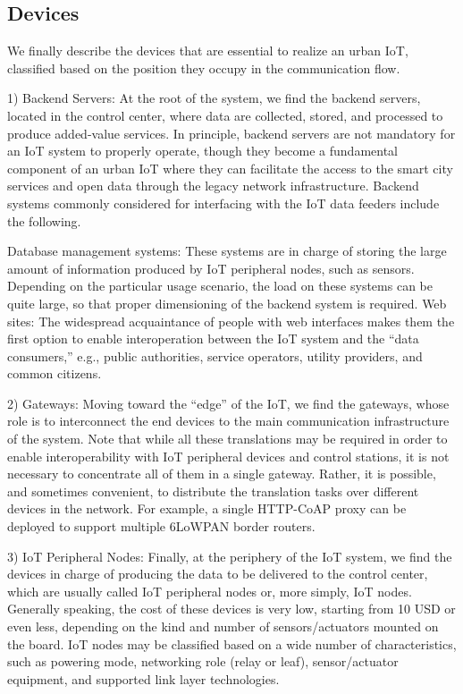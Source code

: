 \documentclass[conference,column]{IEEEtran}
\begin{document}
\subsection{Devices}We finally describe the devices that are essential to realize an urban IoT, classified based on the position they occupy in the communication flow.

1) Backend Servers: At the root of the system, we find the backend servers, located in the control center, where data are collected, stored, and processed to produce added-value services. In principle, backend servers are not mandatory for an IoT system to properly operate, though they become a fundamental component of an urban IoT where they can facilitate the access to
the smart city services and open data through the legacy network infrastructure. Backend systems commonly considered for interfacing with the IoT data feeders include the following.

Database management systems: These systems are in
charge of storing the large amount of information produced by IoT peripheral nodes, such as sensors. Depending on the particular usage scenario, the load on these systems can be quite large, so that proper dimensioning of the backend system is required.
Web sites: The widespread acquaintance of people with web interfaces makes them the first option to enable interoperation between the IoT system and the “data consumers,” e.g., public authorities, service operators, utility providers, and common
citizens.

2) Gateways: Moving toward the “edge” of the IoT, we find the gateways, whose role is to interconnect the end devices to the main communication infrastructure of the system. Note that while all these translations may be required in order to enable interoperability with IoT peripheral devices and control stations, it is not necessary to concentrate all of them in a single
gateway. Rather, it is possible, and sometimes convenient, to distribute the translation tasks over different devices in the network. For example, a single HTTP-CoAP proxy can be deployed to support multiple 6LoWPAN border routers.

3) IoT Peripheral Nodes: Finally, at the periphery of the IoT system, we find the devices in charge of producing the data to be delivered to the control center, which are usually called IoT peripheral nodes or, more simply, IoT nodes. Generally speaking, the cost of these devices is very low, starting from
10 USD or even less, depending on the kind and number of sensors/actuators mounted on the board. IoT nodes may be classified based on a wide number of characteristics, such as powering mode, networking role (relay or leaf), sensor/actuator equipment, and supported link layer technologies.
\end{document}
